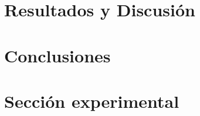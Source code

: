 \documentclass[fleqn,10pt]{SelfArx}
\begin{document}
\section{Resultados y Discusi\'on}

\section{Conclusiones}
\section{Secci\'on experimental}




\newpage
\onecolumn
\end{document}
